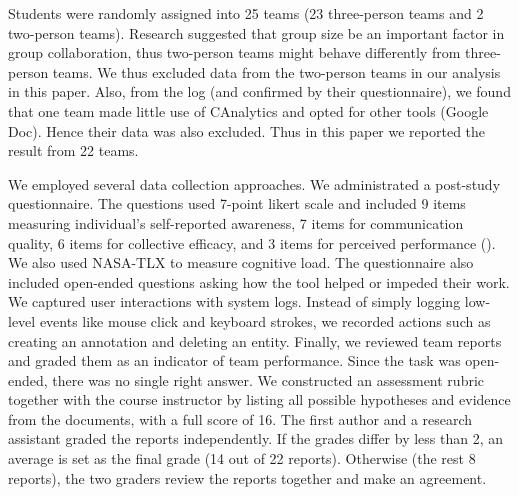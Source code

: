 Students were randomly assigned into 25 teams (23 three-person teams and 2
two-person teams). Research suggested that group size be an important factor in
group collaboration, thus two-person teams might behave differently from
three-person teams. We thus excluded data from the two-person teams in our
analysis in this paper. Also, from the log (and confirmed by their
questionnaire), we found that one team made little use of CAnalytics and opted
for other tools (Google Doc). Hence their data was also excluded. Thus in this
paper we reported the result from 22 teams.

We employed several data collection approaches. We administrated a post-study
questionnaire. The questions used 7-point likert scale and included 9 items measuring individual's
self-reported awareness, 7 items for
communication quality, 6 items for collective efficacy, and 3 items for perceived performance (\cite{Convertino2011}). We also used NASA-TLX \cite{Hart1988} to measure cognitive load. The questionnaire
also included open-ended questions asking how the tool helped or impeded their
work. We captured user interactions with system logs. Instead of simply logging
low-level events like mouse click and keyboard strokes, we recorded actions such
as creating an annotation and deleting an entity. Finally, we reviewed team
reports and graded them as an indicator of team performance. Since the task was
open-ended, there was no single right answer. We constructed an assessment
rubric together with the course instructor by listing all possible hypotheses
and evidence from the documents, with a full score of 16. The first author and a
research assistant graded the reports independently. If the grades differ by
less than 2, an average is set as the final grade (14 out of 22 reports).
Otherwise (the rest 8 reports), the two graders review the reports together and
make an agreement.



